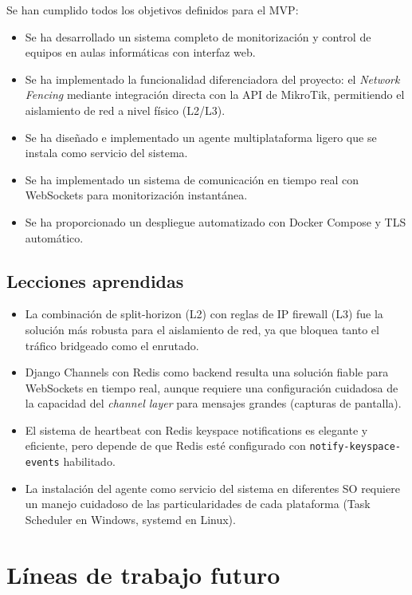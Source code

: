 \documentclass[12pt, a4paper, twoside]{article}
\begin{document}
Se han cumplido todos los objetivos definidos para el MVP:

\begin{itemize}
  \item Se ha desarrollado un sistema completo de monitorización y control de equipos en aulas informáticas con interfaz web.
  \item Se ha implementado la funcionalidad diferenciadora del proyecto: el \textit{Network Fencing} mediante integración directa con la API de MikroTik, permitiendo el aislamiento de red a nivel físico (L2/L3).
  \item Se ha diseñado e implementado un agente multiplataforma ligero que se instala como servicio del sistema.
  \item Se ha implementado un sistema de comunicación en tiempo real con WebSockets para monitorización instantánea.
  \item Se ha proporcionado un despliegue automatizado con Docker Compose y TLS automático.
\end{itemize}

\subsection{Lecciones aprendidas}

\begin{itemize}
  \item La combinación de split-horizon (L2) con reglas de IP firewall (L3) fue la solución más robusta para el aislamiento de red, ya que bloquea tanto el tráfico bridgeado como el enrutado.
  \item Django Channels con Redis como backend resulta una solución fiable para WebSockets en tiempo real, aunque requiere una configuración cuidadosa de la capacidad del \textit{channel layer} para mensajes grandes (capturas de pantalla).
  \item El sistema de heartbeat con Redis keyspace notifications es elegante y eficiente, pero depende de que Redis esté configurado con \texttt{notify-keyspace-events} habilitado.
  \item La instalación del agente como servicio del sistema en diferentes SO requiere un manejo cuidadoso de las particularidades de cada plataforma (Task Scheduler en Windows, systemd en Linux).
\end{itemize}

\section{Líneas de trabajo futuro}
\end{document}
